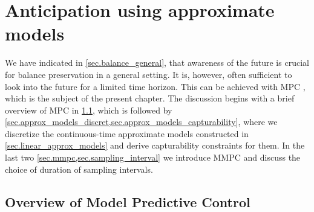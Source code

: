 \chapter{Anticipation using approximate models}
\label{ch.mpc}
\acresetall

We have indicated in \cref{sec.balance_general}, that awareness of the future
is crucial for balance preservation in a general setting. It is, however, often
sufficient to look into the future for a limited time horizon. This can be
achieved with \ac{MPC} \cite{Rawlings2009mpc, Maciejowski2002mpc}, which is the
subject of the present chapter. The discussion begins with a brief overview of
\ac{MPC} in \cref{sec.mpc_overview}, which is followed by
\cref{sec.approx_models_discret,sec.approx_models_capturability}, where we
discretize the continuous-time approximate models constructed in
\cref{sec.linear_approx_models} and derive capturability constraints for them.
In the last two \cref{sec.mmpc,sec.sampling_interval} we introduce \ac{MMPC}
and discuss the choice of duration of sampling intervals.



\section{Overview of Model Predictive Control}\label{sec.mpc_overview}

